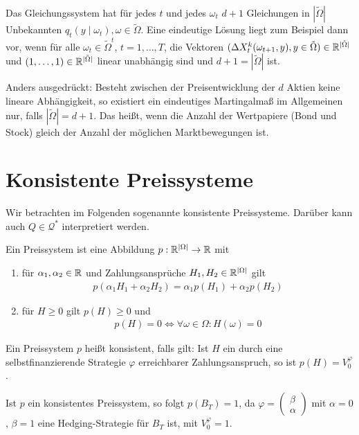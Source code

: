 \documentclass[a4paper,twoside,DIV15,BCOR12mm]{scrbook}
\begin{document}
\begin{bemerkung}
Das Gleichungssystem hat für jedes $t$ und jedes $\omega_t$ $d+1$ Gleichungen in $|\tilde\Omega|$ Unbekannten $q_t(y\mid \omega_t),\omega\in \tilde\Omega$. Eine eindeutige Lösung liegt zum Beispiel dann vor, wenn für alle $\omega_t\in \tilde\Omega^t$, $t=1,\ldots,T$, die Vektoren $(\Delta X_t^k(\omega_{t+1},y), y\in \tilde\Omega)\in \mathbb{R}^{|\tilde\Omega|}$ und $(1,\ldots,1)\in\mathbb{R}^{|\tilde\Omega|}$ linear unabhängig sind und $d+1=|\tilde\Omega|$ ist.

Anders ausgedrückt: Besteht zwischen der Preisentwicklung der $d$ Aktien keine lineare Abhängigkeit, so existiert ein eindeutiges Martingalmaß im Allgemeinen nur, falls $|\tilde\Omega|=d+1$. Das heißt, wenn die Anzahl der Wertpapiere (Bond und Stock) gleich der Anzahl der möglichen Marktbewegungen ist.
\end{bemerkung}

\section{Konsistente Preissysteme}

Wir betrachten im Folgenden sogenannte konsistente Preissysteme. Darüber kann auch $Q\in \mathcal Q^*$ interpretiert werden.

\begin{definition}
Ein Preissystem ist eine Abbildung $p:\mathbb{R}^{|\Omega|} \to \mathbb{R}$ mit
\begin{enumerate}
\item für $\alpha_1,\alpha_2\in \mathbb{R}$ und Zahlungsansprüche $H_1,H_2\in \mathbb{R}^{|\Omega|}$ gilt
\begin{align*}
p(\alpha_1H_1+\alpha_2H_2) = \alpha_1p(H_1) + \alpha_2p(H_2) \tag{„Linearität“}
\end{align*}
\item für $H\ge 0$ gilt $p(H) \ge 0$ und
\begin{align*}
p(H) = 0 \iff \forall \omega\in \Omega: H(\omega) = 0 \tag{„Positivität“}
\end{align*}
\end{enumerate}
Ein Preissystem $p$ heißt konsistent, falls gilt: Ist $H$ ein durch eine selbstfinanzierende Strategie $\varphi$ erreichbarer Zahlungsanspruch, so ist $p(H) = V_0^\varphi$.
\end{definition}

\begin{bemerkung}
Ist $p$ ein konsistentes Preissystem, so folgt $p(B_T)=1$, da 
$\varphi=\left(\begin{smallmatrix} \beta \\ \alpha \end{smallmatrix}\right)$
mit $\alpha=0$, $\beta=1$ eine Hedging-Strategie für $B_T$ ist, mit $V_0^\varphi =1$.
\end{bemerkung}
\end{document}
